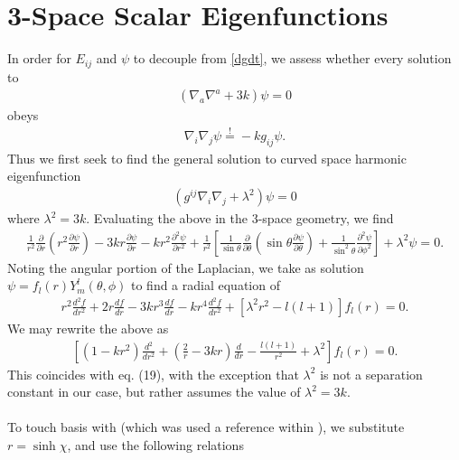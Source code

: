 \documentclass[10pt,letterpaper]{article}
\numberwithin{equation}{section}
\begin{document}
\section{3-Space Scalar Eigenfunctions}
In order for $E_{ij}$ and $\psi$ to decouple from \eqref{dgdt}, we assess whether every solution to
\begin{eqnarray}
(\nabla_a\nabla^a +3k)\psi=0
\end{eqnarray}
obeys
\begin{eqnarray}
\nabla_i \nabla_j \psi \overset{!}{=}-kg_{ij}\psi.
\end{eqnarray}
Thus we first seek to find the general solution to curved space harmonic eigenfunction
\begin{eqnarray}
(g^{ij}\nabla_i \nabla_j +\lambda^2 )\psi=0
\end{eqnarray}
where $\lambda^2 = 3k$. Evaluating the above in the 3-space geometry, we find
\begin{eqnarray}
\frac{1}{r^2}\frac{\partial }{\partial r}\left(r^2\frac{\partial \psi}{\partial r}\right) -3kr \frac{\partial \psi}{\partial r}-kr^2\frac{\partial^2 \psi}{\partial r^2}
+\frac{1}{r^2}\left[ \frac{1}{\sin\theta}\frac{\partial}{\partial \theta}\left(\sin\theta \frac{\partial \psi}{\partial \theta}\right) + \frac{1}{\sin^2\theta}\frac{\partial^2\psi}{\partial \phi^2}\right]+\lambda^2\psi=0.
\end{eqnarray}
Noting the angular portion of the Laplacian, we take as solution $\psi = f_l(r) Y^l_m(\theta,\phi)$ to find a radial equation of 
\begin{eqnarray}
r^2\frac{d^2 f}{dr^2} + 2r\frac{d f}{dr} - 3kr^3 \frac{df}{dr}-kr^4 \frac{d^2 f}{dr^2}+[\lambda^2 r^2-l(l+1)]f_l(r)=0.
\label{radial1}
\end{eqnarray}
We may rewrite the above as
\begin{eqnarray}
\left[ (1-kr^2)\frac{d^2}{dr^2}+ \left(\frac{2}{r}-3kr\right)\frac{d}{dr}-\frac{l(l+1)}{r^2}+\lambda^2 \right]f_l(r)=0.
\label{radial2}
\end{eqnarray}
This coincides with \cite{mannheim1988energy} eq. (19), with the exception that $\lambda^2$ is not a separation constant in our case, but rather assumes the value of $\lambda^2=3k$. 
\\ \\
To touch basis with \cite{bander1966group} (which was used a reference within \cite{mannheim1988energy}),
we substitute $r=\sinh\chi$, and use the following relations
\end{document}
